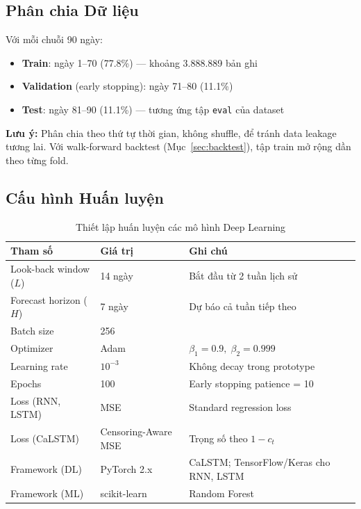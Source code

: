 \documentclass[12pt,a4paper]{report}
\begin{document}
\subsection{Phân chia Dữ liệu}

Với mỗi chuỗi 90 ngày:
\begin{itemize}
    \item \textbf{Train}: ngày 1--70 (77.8\%) --- khoảng 3.888.889 bản ghi
    \item \textbf{Validation} (early stopping): ngày 71--80 (11.1\%)
    \item \textbf{Test}: ngày 81--90 (11.1\%) --- tương ứng tập \texttt{eval} của dataset
\end{itemize}

\textbf{Lưu ý:} Phân chia theo thứ tự thời gian, không shuffle, để tránh data leakage tương lai. Với walk-forward backtest (Mục~\ref{sec:backtest}), tập train mở rộng dần theo từng fold.

\subsection{Cấu hình Huấn luyện}

\begin{table}[H]
\centering
\caption{Thiết lập huấn luyện các mô hình Deep Learning}
\label{tab:train_config}
\begin{tabular}{lll}
\toprule
\textbf{Tham số} & \textbf{Giá trị} & \textbf{Ghi chú} \\
\midrule
Look-back window ($L$) & 14 ngày       & Bắt đầu từ 2 tuần lịch sử \\
Forecast horizon ($H$) & 7 ngày        & Dự báo cả tuần tiếp theo \\
Batch size             & 256           & \\
Optimizer              & Adam          & $\beta_1=0.9,\; \beta_2=0.999$ \\
Learning rate          & $10^{-3}$     & Không decay trong prototype \\
Epochs                 & 100           & Early stopping patience = 10 \\
Loss (RNN, LSTM)       & MSE           & Standard regression loss \\
Loss (CaLSTM)          & Censoring-Aware MSE & Trọng số theo $1 - c_t$ \\
Framework (DL)         & PyTorch 2.x   & CaLSTM; TensorFlow/Keras cho RNN, LSTM \\
Framework (ML)         & scikit-learn  & Random Forest \\
\bottomrule
\end{tabular}
\end{table}
\end{document}
